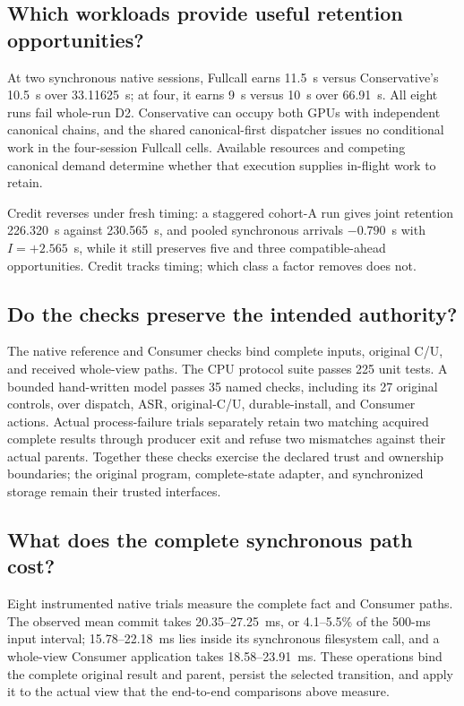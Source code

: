 \subsection{Which workloads provide useful retention opportunities?}
At two synchronous native sessions, Fullcall earns 11.5~s versus
Conservative's 10.5~s over 33.11625~s; at four, it earns 9~s versus
10~s over 66.91~s. All eight runs fail whole-run D2. Conservative can
occupy both GPUs with independent canonical chains, and the shared
canonical-first dispatcher issues no conditional work in the four-session
Fullcall cells. Available resources and competing canonical demand
determine whether that execution supplies in-flight work to retain.

Credit reverses under fresh timing: a staggered cohort-A run gives joint
retention 226.320~s against 230.565~s, and pooled synchronous arrivals
$-0.790$~s with $I=+2.565$~s, while it still preserves five and three
compatible-ahead opportunities. Credit tracks timing; which class a
factor removes does not.

\subsection{Do the checks preserve the intended authority?}
The native reference and Consumer checks bind complete inputs, original
C/U, and received whole-view paths. The CPU protocol suite passes
225 unit tests. A bounded hand-written model passes 35 named checks, including
its 27 original controls, over dispatch, ASR, original-C/U, durable-install,
and Consumer actions. Actual process-failure trials separately retain
two matching acquired complete results through producer exit and refuse
two mismatches against their actual parents. Together these checks
exercise the declared trust and ownership boundaries; the original
program, complete-state adapter, and synchronized storage remain their
trusted interfaces.

\subsection{What does the complete synchronous path cost?}
Eight instrumented native trials measure the complete fact and
Consumer paths. The observed mean commit takes 20.35--27.25~ms, or
4.1--5.5\% of the 500-ms input interval; 15.78--22.18~ms lies inside
its synchronous filesystem call, and a whole-view Consumer application
takes 18.58--23.91~ms. These operations bind the complete original
result and parent, persist the selected transition, and apply it to the
actual view that the end-to-end comparisons above measure.
